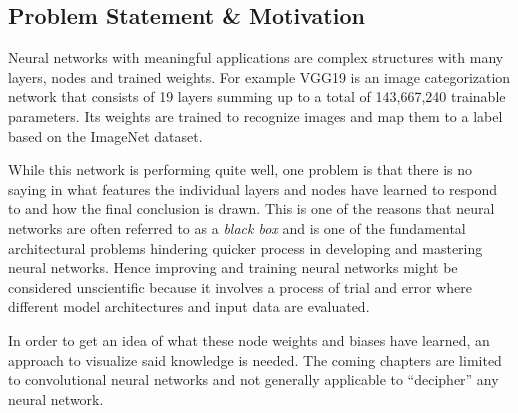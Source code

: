 \subsection{Problem Statement \& Motivation}
\label{sec:problem-statement}
Neural networks with meaningful applications are complex structures with many layers, nodes and trained weights.
For example VGG19 is an image categorization network that consists of 19 layers summing up to a total of 143,667,240 trainable parameters.\cite{vgg} Its weights are trained to recognize images and map them to a label based on the ImageNet dataset.\cite{imagenet}

While this network is performing quite well, one problem is that there is no saying in what features the individual layers and nodes have learned to respond to and how the final conclusion is drawn.\cite{castelvecchi2016can}
This is one of the reasons that neural networks are often referred to as a \textit{black box} and is one of the fundamental architectural problems hindering quicker process in developing and mastering neural networks.\cite{olden2002illuminating}
Hence improving and training neural networks might be considered unscientific because it involves a process of trial and error where different model architectures and input data are evaluated.\cite{zeiler2014visualizing}


In order to get an idea of what these node weights and biases have learned, an approach to visualize said knowledge is needed.
The coming chapters are limited to convolutional neural networks and not generally applicable to \enquote{decipher} any neural network.